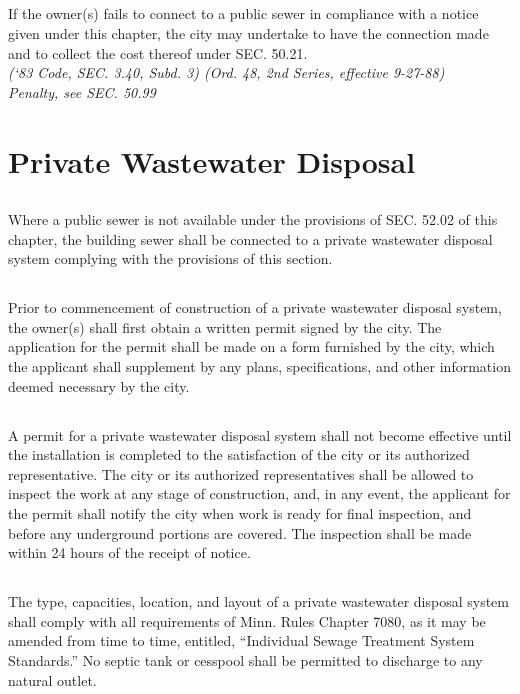 \subsection{}
If the owner(s) fails to connect to a public sewer in compliance with a notice given under this chapter, the city may undertake to have the connection made and to collect the cost thereof under SEC. 50.21.\\
\emph{(‘83 Code, SEC. 3.40, Subd. 3) (Ord. 48, 2nd Series, effective 9-27-88)}\\
\emph{Penalty, see SEC. 50.99}
\section{Private Wastewater Disposal}
\subsection{}
Where a public sewer is not available under the provisions of SEC. 52.02 of this chapter, the building sewer shall be connected to a private wastewater disposal system complying with the provisions of this section.
\subsection{}
Prior to commencement of construction of a private wastewater disposal system, the owner(s) shall first obtain a written permit signed by the city.  The application for the permit shall be made on a form furnished by the city, which the applicant shall supplement by any plans, specifications, and other information deemed necessary by the city.
\subsection{}
A permit for a private wastewater disposal system shall not become effective until the installation is completed to the satisfaction of the city or its authorized representative.  The city or its authorized representatives shall be allowed to inspect the work at any stage of construction, and, in any event, the applicant for the permit shall notify the city when work is ready for final inspection, and before any underground portions are covered.  The inspection shall be made within 24 hours of the receipt of notice.
\subsection{}
The type, capacities, location, and layout of a private wastewater disposal system shall comply with all requirements of Minn. Rules Chapter 7080, as it may be amended from time to time, entitled, “Individual Sewage Treatment System Standards.” No septic tank or cesspool shall be permitted to discharge to any natural outlet.
